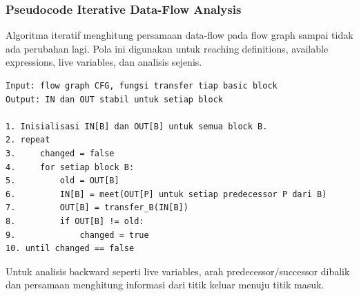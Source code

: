 \subsubsection{Pseudocode Iterative Data-Flow Analysis}

\begin{jawab}
Algoritma iteratif menghitung persamaan data-flow pada flow graph sampai tidak ada perubahan lagi. Pola ini digunakan untuk reaching definitions, available expressions, live variables, dan analisis sejenis.
\end{jawab}

\begin{lstlisting}[caption={Pseudocode iterative data-flow analysis}, label={lst:data-flow}]
Input: flow graph CFG, fungsi transfer tiap basic block
Output: IN dan OUT stabil untuk setiap block

1. Inisialisasi IN[B] dan OUT[B] untuk semua block B.
2. repeat
3.     changed = false
4.     for setiap block B:
5.         old = OUT[B]
6.         IN[B] = meet(OUT[P] untuk setiap predecessor P dari B)
7.         OUT[B] = transfer_B(IN[B])
8.         if OUT[B] != old:
9.             changed = true
10. until changed == false
\end{lstlisting}

Untuk analisis backward seperti live variables, arah predecessor/successor dibalik dan persamaan menghitung informasi dari titik keluar menuju titik masuk.
